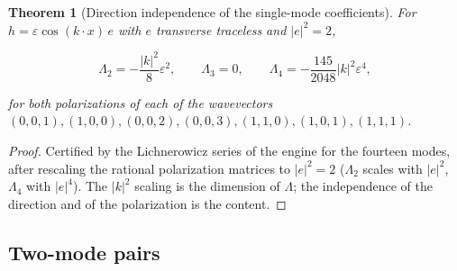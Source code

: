 \documentclass[11pt]{article}
\newtheorem{theorem}{Theorem}[section]
\theoremstyle{remark}
\begin{document}
\begin{theorem}[Direction independence of the single-mode coefficients]
\label{thm:v19v94-single}
For \(h=\varepsilon\cos(k\cdot x)\,e\) with \(e\) transverse
traceless and \(|e|^2=2\),

\[
 \Lambda_2=-\frac{|k|^2}8\varepsilon^2,\qquad \Lambda_3=0,\qquad
 \Lambda_4=-\frac{145}{2048}|k|^2\varepsilon^4,                        \tag{97.1}
\]

for both polarizations of each of the wavevectors
\((0,0,1),(1,0,0),(0,0,2),(0,0,3),(1,1,0),(1,0,1),(1,1,1)\).
\end{theorem}

\begin{proof}
Certified by the Lichnerowicz series of the engine for the fourteen
modes, after rescaling the rational polarization matrices to
\(|e|^2=2\) (\(\Lambda_2\) scales with \(|e|^2\), \(\Lambda_4\) with
\(|e|^4\)).  The \(|k|^2\) scaling is the dimension of \(\Lambda\); the
independence of the direction and of the polarization is the
content.
\end{proof}

\subsection{Two-mode pairs}
\end{document}
